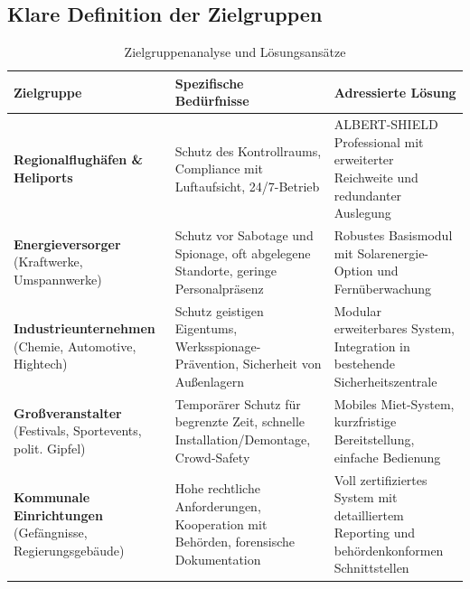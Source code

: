 \documentclass[11pt,a4paper]{article}
\begin{document}
\subsection{Klare Definition der Zielgruppen}
\begin{table}[ht]
\centering
\begin{tabularx}{\textwidth}{lYY}
\toprule
\textbf{Zielgruppe} & \textbf{Spezifische Bedürfnisse} & \textbf{Adressierte Lösung} \\
\midrule
\textbf{Regionalflughäfen \& Heliports} & Schutz des Kontrollraums, Compliance mit Luftaufsicht, 24/7-Betrieb & ALBERT-SHIELD Professional mit erweiterter Reichweite und redundanter Auslegung \\
\addlinespace
\textbf{Energieversorger} (Kraftwerke, Umspannwerke) & Schutz vor Sabotage und Spionage, oft abgelegene Standorte, geringe Personalpräsenz & Robustes Basismodul mit Solarenergie-Option und Fernüberwachung \\
\addlinespace
\textbf{Industrieunternehmen} (Chemie, Automotive, Hightech) & Schutz geistigen Eigentums, Werksspionage-Prävention, Sicherheit von Außenlagern & Modular erweiterbares System, Integration in bestehende Sicherheitszentrale \\
\addlinespace
\textbf{Großveranstalter} (Festivals, Sportevents, polit. Gipfel) & Temporärer Schutz für begrenzte Zeit, schnelle Installation/Demontage, Crowd-Safety & Mobiles Miet-System, kurzfristige Bereitstellung, einfache Bedienung \\
\addlinespace
\textbf{Kommunale Einrichtungen} (Gefängnisse, Regierungsgebäude) & Hohe rechtliche Anforderungen, Kooperation mit Behörden, forensische Dokumentation & Voll zertifiziertes System mit detailliertem Reporting und behördenkonformen Schnittstellen \\
\bottomrule
\end{tabularx}
\caption{Zielgruppenanalyse und Lösungsansätze}
\end{table}
\end{document}
